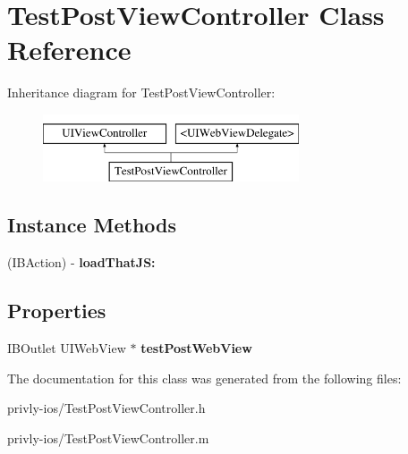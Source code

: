 \hypertarget{interface_test_post_view_controller}{\section{Test\-Post\-View\-Controller Class Reference}
\label{interface_test_post_view_controller}
}
Inheritance diagram for Test\-Post\-View\-Controller\-:\begin{figure}[H]
\begin{center}
\leavevmode
\includegraphics[height=2.000000cm]{interface_test_post_view_controller}
\end{center}
\end{figure}
\subsection*{Instance Methods}
\begin{DoxyCompactItemize}
\item 
\hypertarget{interface_test_post_view_controller_a771b1fa45892dd8f4f4a9ddffe5baa15}{(I\-B\-Action) -\/ {\bfseries load\-That\-J\-S\-:}}\label{interface_test_post_view_controller_a771b1fa45892dd8f4f4a9ddffe5baa15}

\end{DoxyCompactItemize}
\subsection*{Properties}
\begin{DoxyCompactItemize}
\item 
\hypertarget{interface_test_post_view_controller_a7428b142997a44872280c1e1443b44b8}{I\-B\-Outlet U\-I\-Web\-View $\ast$ {\bfseries test\-Post\-Web\-View}}\label{interface_test_post_view_controller_a7428b142997a44872280c1e1443b44b8}

\end{DoxyCompactItemize}


The documentation for this class was generated from the following files\-:\begin{DoxyCompactItemize}
\item 
privly-\/ios/Test\-Post\-View\-Controller.\-h\item 
privly-\/ios/Test\-Post\-View\-Controller.\-m\end{DoxyCompactItemize}
